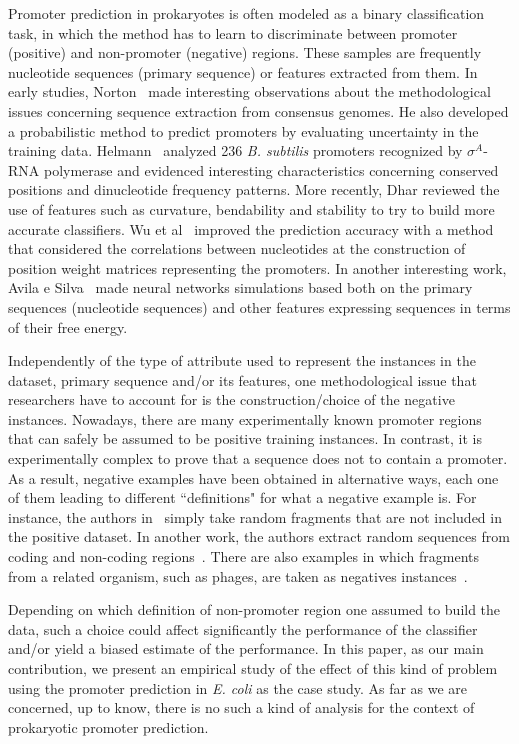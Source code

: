 \documentclass[runningheads,a4paper]{llncs}
\begin{document}
Promoter prediction in prokaryotes is often modeled as a binary classification task, in which the method has to learn to discriminate between promoter (positive) and non-promoter  (negative)  regions. These samples are frequently  nucleotide sequences (primary sequence) or features extracted from them. In early studies, Norton~\cite{norton1994} made interesting observations about the methodological issues concerning sequence extraction from consensus genomes. He also developed a probabilistic method to predict promoters by evaluating uncertainty in the training data. Helmann~\cite{helmann1995} analyzed 236 {\it B. subtilis} promoters recognized by ${\sigma }^{{A}}$-RNA polymerase and evidenced interesting characteristics concerning conserved positions and dinucleotide frequency patterns. More recently, Dhar \cite{dhar2010} reviewed the use of features such as curvature, bendability and stability to try to build more accurate  classifiers. Wu et al~\cite{wu2011} improved the prediction accuracy with a method that considered the correlations between nucleotides at the construction of position weight matrices representing the promoters. In another interesting work, Avila e Silva~\cite{avila2011} made neural networks simulations based both on the primary sequences (nucleotide sequences)  and other  features expressing sequences in terms of their free energy.

Independently of the  type of attribute used to represent the instances in the dataset, primary sequence and/or its features, one methodological issue that researchers have to account for is the construction/choice of the negative instances.  Nowadays, there are many experimentally known promoter regions that can safely be assumed to be positive training instances. In contrast,  it is experimentally complex to prove that a sequence does not to contain a promoter. As a result, negative examples have been obtained in alternative ways, each one of them leading to different ``definitions" for what a negative example is. For instance,  the authors in~\cite{bland2010} simply take random fragments that are not included in the positive dataset. In another work, the authors  extract random sequences from coding and non-coding regions~\cite{gordon2003}.  There are also examples in which fragments from a related organism, such as phages, are taken as negatives instances~\cite{towell1993,monteiro2005}. 

Depending on which definition of non-promoter region one assumed to  build  the data, such a choice  could affect  significantly the performance of the classifier and/or yield a biased estimate of the performance. In this paper, as our main contribution, we present an empirical study of the effect of this kind of problem using  the promoter prediction in {\it E. coli} as  the case study. As far as  we are concerned, up to know, there is no such a kind of analysis for the context of prokaryotic promoter prediction.
\end{document}
